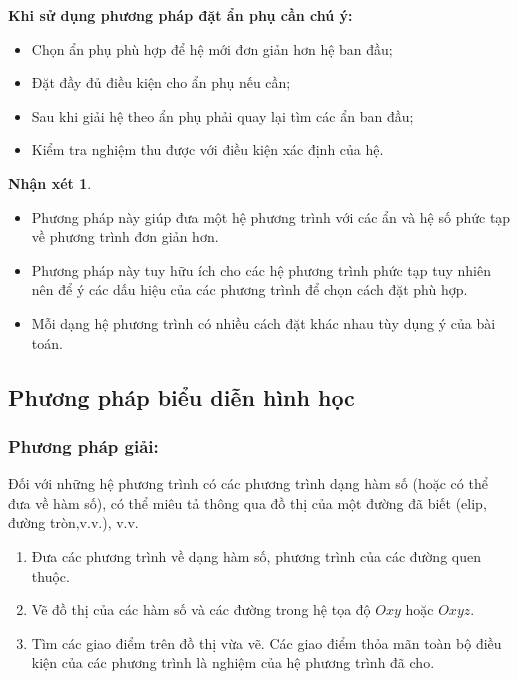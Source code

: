 \documentclass[12pt,a4paper,oneside]{book}
\theoremstyle{theorem}
\theoremstyle{definition}
\newtheorem{nx}[theorem2]{Nhận xét}
\begin{document}
\textbf{Khi sử dụng phương pháp đặt ẩn phụ cần chú ý:}
\begin{itemize}
    \item Chọn ẩn phụ phù hợp để hệ mới đơn giản hơn hệ ban đầu;
    \item Đặt đầy đủ điều kiện cho ẩn phụ nếu cần;
    \item Sau khi giải hệ theo ẩn phụ phải quay lại tìm các ẩn ban đầu;
    \item Kiểm tra nghiệm thu được với điều kiện xác định của hệ.
\end{itemize}
\begin{nx}
\begin{itemize}
    \item Phương pháp này giúp đưa một hệ phương trình với các ẩn và hệ số phức tạp về phương trình đơn giản hơn.
    \item Phương pháp này tuy hữu ích cho các hệ phương trình phức tạp tuy nhiên nên để ý các dấu hiệu của các phương trình để chọn cách đặt phù hợp.
    \item Mỗi dạng hệ phương trình có nhiều cách đặt khác nhau tùy dụng ý của bài toán.
\end{itemize}    
\end{nx}

            \subsection{Phương pháp biểu diễn hình học}
        \subsubsection{Phương pháp giải:}
Đối với những hệ phương trình có các phương trình dạng hàm số (hoặc có thể đưa về hàm số), có thể miêu tả thông qua đồ thị của một đường đã biết (elip, đường tròn,v.v.), v.v.
\begin{enumerate}
    \item Đưa các phương trình về dạng hàm số, phương trình của các đường quen thuộc.
    \item Vẽ đồ thị của các hàm số và các đường trong hệ tọa độ $Oxy$ hoặc $Oxyz$.
    \item Tìm các giao điểm trên đồ thị vừa vẽ. Các giao điểm thỏa mãn toàn bộ điều kiện của các phương trình là nghiệm của hệ phương trình đã cho.
\end{enumerate}
\end{document}
